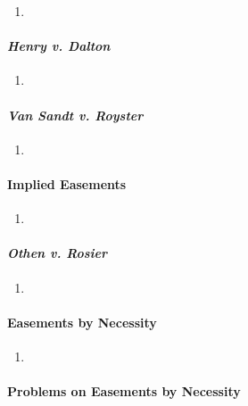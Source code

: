 \begin{enumerate}
    \item %
\end{enumerate}

\paragraph{\emph{Henry v. Dalton}}

\begin{enumerate}
    \item %
\end{enumerate}

\paragraph{\emph{Van Sandt v. Royster}}

\begin{enumerate}
    \item %
\end{enumerate}

\paragraph{Implied Easements}

\begin{enumerate}
    \item %
\end{enumerate}

\paragraph{\emph{Othen v. Rosier}}

\begin{enumerate}
    \item %
\end{enumerate}

\paragraph{Easements by Necessity}

\begin{enumerate}
    \item %
\end{enumerate}

\paragraph{Problems on Easements by Necessity}

